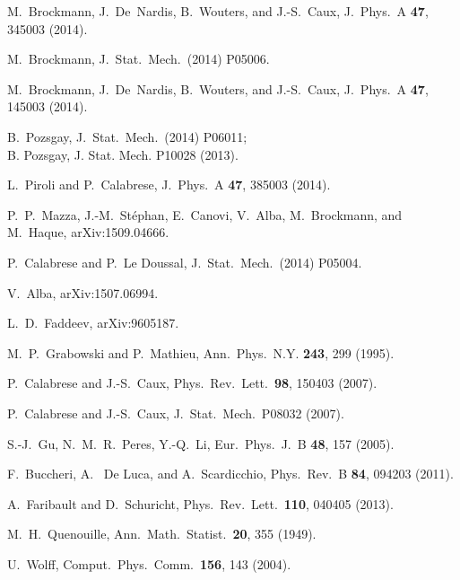\documentclass[11pt]{iopart}
\begin{document}
\begin{thebibliography}{99}
M.~Brockmann, J.~De~Nardis, B.~Wouters, and J.-S.~Caux, J.\ Phys.\ A {\bf 47}, 345003 (2014). 


M.~Brockmann, J.\ Stat.\ Mech.\ (2014) P05006. 


M.~Brockmann, J.~De~Nardis, B.~Wouters, and J.-S.~Caux, J.\ Phys.\ A {\bf 47}, 145003 (2014). 


B.~Pozsgay, J.\ Stat.\ Mech.\ (2014) P06011;\\ 
B. Pozsgay, J. Stat. Mech. P10028 (2013).
 


L.~Piroli and P.~Calabrese, J.\ Phys.\ A {\bf 47}, 385003 (2014). 


P.~P.~Mazza, J.-M.~St\'ephan, E.~Canovi, V.~Alba, M.~Brockmann, and M.~Haque,  arXiv:1509.04666.


P.~Calabrese and P.~Le Doussal, J.\ Stat.\ Mech.\ (2014) P05004. 


V.~Alba, arXiv:1507.06994.


L.~D.~Faddeev, arXiv:9605187.


M.~P.~Grabowski and P.~Mathieu, Ann.\ Phys.\ N.Y. {\bf 243}, 
299 (1995). 


P.~Calabrese and J.-S.~Caux, Phys.\ Rev.\ Lett.\ {\bf 98}, 150403 (2007).


P.~Calabrese and J.-S.~Caux, J.\ Stat.\ Mech.\ P08032 (2007).





S.-J.~Gu, N.~M.~R.~Peres, Y.-Q.~Li, Eur.\ Phys.\ J.\ B {\bf 48}, 
157 (2005). 


F.~Buccheri, A.~ De Luca, and A.~Scardicchio, Phys.\ Rev.\ B {\bf 84}, 
094203 (2011).


A.~Faribault and D.~Schuricht, Phys.\ Rev.\ Lett.\ {\bf 110}, 040405 
(2013). 


M.~H.~Quenouille, Ann.\ Math.\ Statist.\ {\bf 20}, 355 (1949).


U.~Wolff, Comput.\ Phys.\ Comm.\ {\bf 156}, 143 (2004). 










\end{thebibliography}
\end{document}
